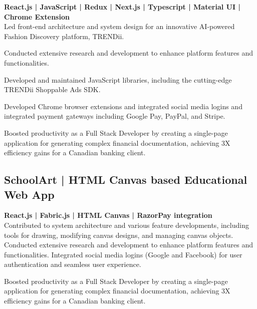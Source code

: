\documentclass[letterpaper]{deedy-resume} %
\begin{document}
\begin{minipage}[t]{0.66\textwidth}
\textbf{React.js | JavaScript | Redux | Next.js | Typescript | Material UI | Chrome Extension} \\
Led front-end architecture and system design for an innovative AI-powered Fashion Discovery platform, TRENDii.

Conducted extensive research and development to enhance platform features and functionalities.

Developed and maintained JavaScript libraries, including the cutting-edge TRENDii Shoppable Ads SDK.

Developed Chrome browser extensions and integrated social media logins and integrated payment gateways including Google Pay, PayPal, and Stripe.

Boosted productivity as a Full Stack Developer by creating a single-page application for generating complex financial documentation, achieving 3X efficiency gains for a Canadian banking client.

\sectionspace %


\subsection{SchoolArt | HTML Canvas based Educational Web App}


\textbf{React.js | Fabric.js | HTML Canvas | RazorPay integration} \\

Contributed to system architecture and various feature developments, including tools for drawing, modifying canvas designs, and managing canvas objects.
Conducted extensive research and development to enhance platform features and functionalities.
Integrated social media logins (Google and Facebook) for user authentication and seamless user experience.

Boosted productivity as a Full Stack Developer by creating a single-page application for generating complex financial documentation, achieving 3X efficiency gains for a Canadian banking client.

\sectionspace %




\end{minipage} %

\end{document}
